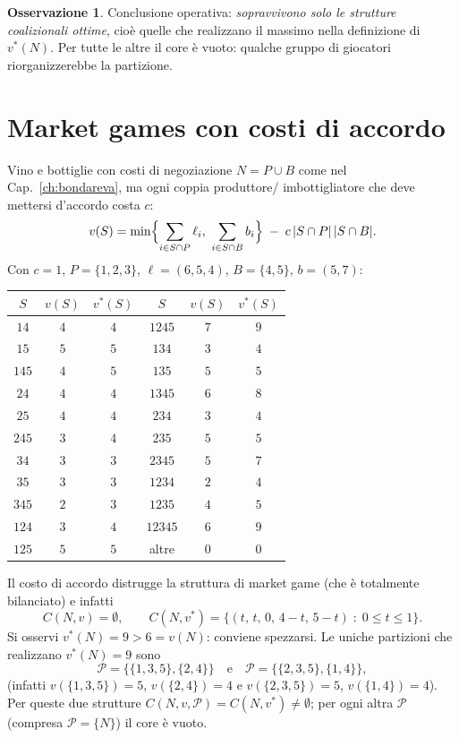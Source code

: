 \documentclass[12pt,a4paper,twoside]{book}
\theoremstyle{plain}
\theoremstyle{definition}
\newtheorem{remark}[theorem]{Osservazione}
\begin{document}
\begin{remark}
Conclusione operativa: \emph{sopravvivono solo le strutture coalizionali ottime},
cioè quelle che realizzano il massimo nella definizione di $v^{*}(N)$. Per tutte
le altre il core è vuoto: qualche gruppo di giocatori riorganizzerebbe la
partizione.
\end{remark}

\section{Market games con costi di accordo}

\begin{exbox}{Vino e bottiglie con costi di negoziazione}
$N=P\cup B$ come nel Cap.~\ref{ch:bondareva}, ma ogni coppia produttore/
imbottigliatore che deve mettersi d'accordo costa $c$:
\[
  v(S)=\min\Bigl\{\sum_{i\in S\cap P}\ell_i,\ \sum_{i\in S\cap B}b_i\Bigr\}\;-\;c\,|S\cap P|\,|S\cap B| .
\]
Con $c=1$, $P=\{1,2,3\}$, $\ell=(6,5,4)$, $B=\{4,5\}$, $b=(5,7)$:
\begin{center}
\begin{tabular}{ccc@{\qquad}ccc}
\toprule
$S$ & $v(S)$ & $v^{*}(S)$ & $S$ & $v(S)$ & $v^{*}(S)$\\
\midrule
$14$  & $4$ & $4$ & $1245$  & $7$ & $9$\\
$15$  & $5$ & $5$ & $134$   & $3$ & $4$\\
$145$ & $4$ & $5$ & $135$   & $5$ & $5$\\
$24$  & $4$ & $4$ & $1345$  & $6$ & $8$\\
$25$  & $4$ & $4$ & $234$   & $3$ & $4$\\
$245$ & $3$ & $4$ & $235$   & $5$ & $5$\\
$34$  & $3$ & $3$ & $2345$  & $5$ & $7$\\
$35$  & $3$ & $3$ & $1234$  & $2$ & $4$\\
$345$ & $2$ & $3$ & $1235$  & $4$ & $5$\\
$124$ & $3$ & $4$ & $12345$ & $6$ & $9$\\
$125$ & $5$ & $5$ & altre   & $0$ & $0$\\
\bottomrule
\end{tabular}
\end{center}
Il costo di accordo distrugge la struttura di market game (che è totalmente
bilanciato) e infatti
\[
  C(N,v)=\emptyset,\qquad
  C(N,v^{*})=\{(t,\,t,\,0,\,4-t,\,5-t)\;:\;0\le t\le 1\}.
\]
Si osservi $v^{*}(N)=9>6=v(N)$: conviene spezzarsi. Le uniche partizioni che
realizzano $v^{*}(N)=9$ sono
\[
  \mathcal{P}=\bigl\{\{1,3,5\},\{2,4\}\bigr\}
  \quad\text{e}\quad
  \mathcal{P}=\bigl\{\{2,3,5\},\{1,4\}\bigr\},
\]
(infatti $v(\{1,3,5\})=5$, $v(\{2,4\})=4$ e $v(\{2,3,5\})=5$, $v(\{1,4\})=4$).
Per queste due strutture $C(N,v,\mathcal{P})=C(N,v^{*})\ne\emptyset$; per ogni
altra $\mathcal{P}$ (compresa $\mathcal{P}=\{N\}$) il core è vuoto.
\end{exbox}
\end{document}
